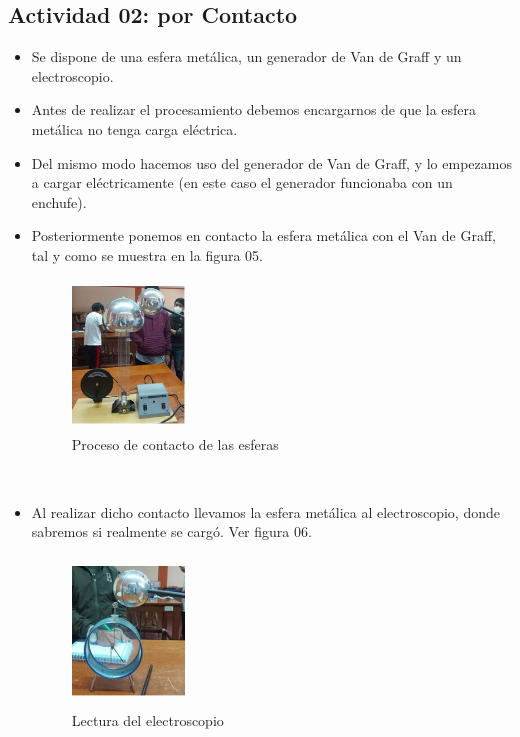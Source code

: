 \subsection{Actividad 02: por Contacto}
\begin{itemize}
	\item Se dispone de una esfera metálica, un generador de Van de Graff y un electroscopio. 
	\item Antes de realizar el procesamiento debemos encargarnos de que la esfera metálica no tenga carga eléctrica.
	\item Del mismo modo hacemos uso del generador de Van de Graff, y lo empezamos a cargar eléctricamente (en este caso el generador funcionaba con un enchufe).
	\item Posteriormente ponemos en contacto la esfera metálica con el Van de Graff, tal y como se muestra en la figura 05.
	\begin{figure}[h]
		\centering
		\includegraphics[width=3cm, height=4cm]{imagenes/porcontacto.jpg}
		\caption{Proceso de contacto de las esferas}
	\end{figure}\\
\end{itemize}
\begin{itemize}
	\item Al realizar dicho contacto llevamos la esfera metálica al electroscopio, donde sabremos si realmente se cargó. Ver figura 06.
	\begin{figure}[h]
		\centering
		\includegraphics[width=3cm, height=4cm]{imagenes/electrometro2.jpg}
		\caption{Lectura del electroscopio}
	\end{figure}\\
\end{itemize}

